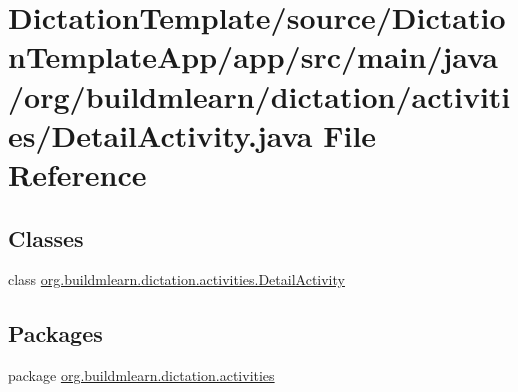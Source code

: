 \hypertarget{DictationTemplate_2source_2DictationTemplateApp_2app_2src_2main_2java_2org_2buildmlearn_2dictati439f1b62b8cfb7bea3b0953394ec23ab}{}\section{Dictation\+Template/source/\+Dictation\+Template\+App/app/src/main/java/org/buildmlearn/dictation/activities/\+Detail\+Activity.java File Reference}
\label{DictationTemplate_2source_2DictationTemplateApp_2app_2src_2main_2java_2org_2buildmlearn_2dictati439f1b62b8cfb7bea3b0953394ec23ab}
\subsection*{Classes}
\begin{DoxyCompactItemize}
\item 
class \hyperlink{classorg_1_1buildmlearn_1_1dictation_1_1activities_1_1DetailActivity}{org.\+buildmlearn.\+dictation.\+activities.\+Detail\+Activity}
\end{DoxyCompactItemize}
\subsection*{Packages}
\begin{DoxyCompactItemize}
\item 
package \hyperlink{namespaceorg_1_1buildmlearn_1_1dictation_1_1activities}{org.\+buildmlearn.\+dictation.\+activities}
\end{DoxyCompactItemize}
